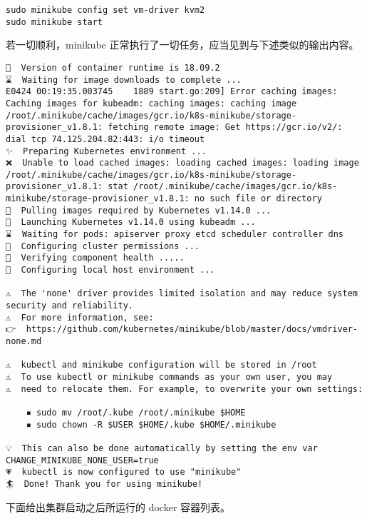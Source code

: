 \begin{lstlisting}
sudo minikube config set vm-driver kvm2
sudo minikube start
\end{lstlisting}

若一切顺利，minikube 正常执行了一切任务，应当见到与下述类似的输出内容。

\begin{lstlisting}
🐳  Version of container runtime is 18.09.2
⌛  Waiting for image downloads to complete ...
E0424 00:19:35.003745    1889 start.go:209] Error caching images:  Caching images for kubeadm: caching images: caching image /root/.minikube/cache/images/gcr.io/k8s-minikube/storage-provisioner_v1.8.1: fetching remote image: Get https://gcr.io/v2/: dial tcp 74.125.204.82:443: i/o timeout
✨  Preparing Kubernetes environment ...
❌  Unable to load cached images: loading cached images: loading image /root/.minikube/cache/images/gcr.io/k8s-minikube/storage-provisioner_v1.8.1: stat /root/.minikube/cache/images/gcr.io/k8s-minikube/storage-provisioner_v1.8.1: no such file or directory
🚜  Pulling images required by Kubernetes v1.14.0 ...
🚀  Launching Kubernetes v1.14.0 using kubeadm ... 
⌛  Waiting for pods: apiserver proxy etcd scheduler controller dns
🔑  Configuring cluster permissions ...
🤔  Verifying component health .....
🤹  Configuring local host environment ...

⚠️  The 'none' driver provides limited isolation and may reduce system security and reliability.
⚠️  For more information, see:
👉  https://github.com/kubernetes/minikube/blob/master/docs/vmdriver-none.md

⚠️  kubectl and minikube configuration will be stored in /root
⚠️  To use kubectl or minikube commands as your own user, you may
⚠️  need to relocate them. For example, to overwrite your own settings:

    ▪ sudo mv /root/.kube /root/.minikube $HOME
    ▪ sudo chown -R $USER $HOME/.kube $HOME/.minikube

💡  This can also be done automatically by setting the env var CHANGE_MINIKUBE_NONE_USER=true
💗  kubectl is now configured to use "minikube"
🏄  Done! Thank you for using minikube!
\end{lstlisting}

下面给出集群启动之后所运行的 docker 容器列表。


